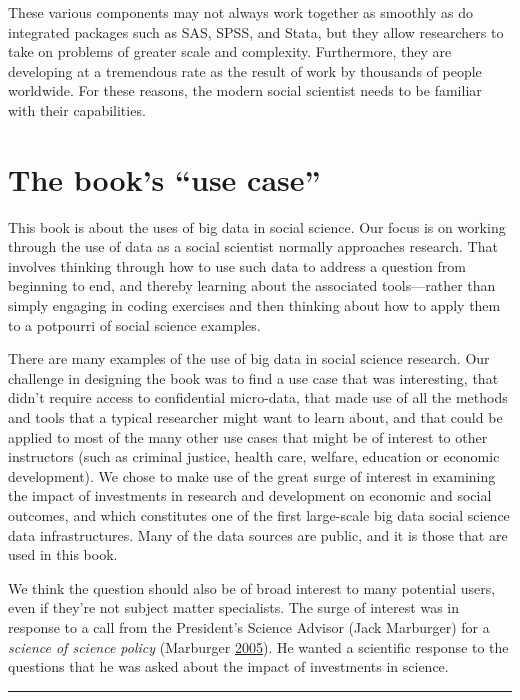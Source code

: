 \documentclass[]{krantz}
\begin{document}
These various components may not always work together as smoothly as do
integrated packages such as SAS, SPSS, and Stata, but they allow
researchers to take on problems of greater scale and complexity.
Furthermore, they are developing at a tremendous rate as the result of
work by thousands of people worldwide. For these reasons, the modern
social scientist needs to be familiar with their capabilities.

\section{\texorpdfstring{The book's ``use
case''}{The book's use case}}\label{sec:1-6}

This book is about the uses of big data in social science. Our focus is
on working through the use of data as a social scientist normally
approaches research. That involves thinking through how to use such data
to address a question from beginning to end, and thereby learning about
the associated tools---rather than simply engaging in coding exercises
and then thinking about how to apply them to a potpourri of social
science examples.

There are many examples of the use of big data in social science
research. Our challenge in designing the book was to find a use case
that was interesting, that didn't require access to confidential
micro-data, that made use of all the methods and tools that a typical
researcher might want to learn about, and that could be applied to most
of the many other use cases that might be of interest to other
instructors (such as criminal justice, health care, welfare, education
or economic development). We chose to make use of the great surge of
interest in examining the impact of investments in research and
development on economic and social outcomes, and which constitutes one
of the first large-scale big data social science data infrastructures.
Many of the data sources are public, and it is those that are used in
this book.

We think the question should also be of broad interest to many potential
users, even if they're not subject matter specialists. The surge of
interest was in response to a call from the President's Science Advisor
(Jack Marburger) for a \emph{science of science policy} (Marburger
\protect\hyperlink{ref-marburger2005wanted}{2005}). He wanted a
scientific response to the questions that he was asked about the impact
of investments in science.

\begin{center}\rule{0.5\linewidth}{\linethickness}\end{center}
\end{document}
